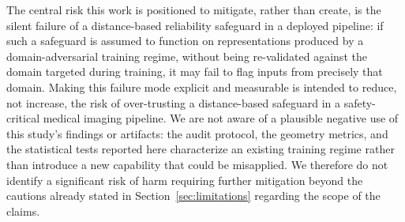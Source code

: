 The central risk this work is positioned to mitigate, rather than create, is the silent failure of a distance-based reliability safeguard in a deployed pipeline: if such a safeguard is assumed to function on representations produced by a domain-adversarial training regime, without being re-validated against the domain targeted during training, it may fail to flag inputs from precisely that domain. Making this failure mode explicit and measurable is intended to reduce, not increase, the risk of over-trusting a distance-based safeguard in a safety-critical medical imaging pipeline. We are not aware of a plausible negative use of this study's findings or artifacts: the audit protocol, the geometry metrics, and the statistical tests reported here characterize an existing training regime rather than introduce a new capability that could be misapplied. We therefore do not identify a significant risk of harm requiring further mitigation beyond the cautions already stated in Section~\ref{sec:limitations} regarding the scope of the claims.

